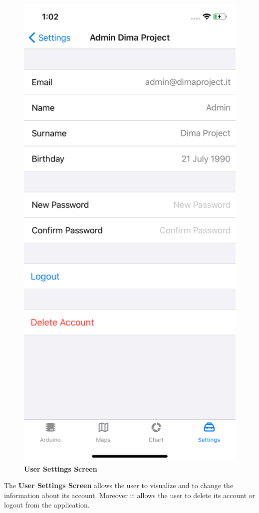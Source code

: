 \begin{figure}[H]
\centering
\includegraphics[height=.6\textheight]{./img/ui/user_settings.png}
\caption{\textbf{User Settings Screen}}
\end{figure}
\begin{center}
The \textbf{User Settings Screen} allows the user to visualize and to change the information about its account. Moreover it allows the user to delete its account or logout from the application.
\end{center}

